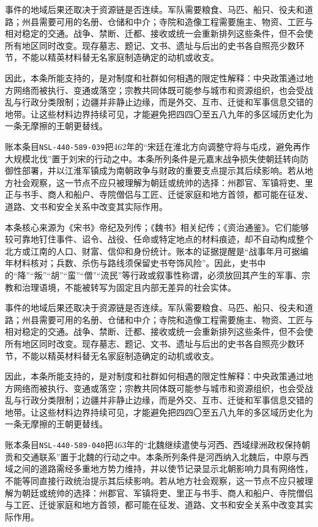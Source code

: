 事件的地域后果还取决于资源链是否连续。军队需要粮食、马匹、船只、役夫和道路；州县需要可用的名册、仓储和中介；寺院和造像工程需要施主、物资、工匠与相对稳定的交通。战争、禁断、迁都、接收或统一会重新排列这些条件，但不会使所有地区同时改变。现存墓志、题记、文书、遗址与后出的史书各自照亮少数环节，不能以精英材料替无名家庭制造确定的动机或收支。

因此，本条所能支持的，是对制度和社群如何相遇的限定性解释：中央政策通过地方网络而被执行、变通或落空；宗教共同体既可能参与城市和资源组织，也会受战乱与行政分类限制；边疆并非静止边缘，而是外交、互市、迁徙和军事信息交错的地带。让这些材料边界持续可见，才能避免把四四〇至五八九年的多区域历史化为一条无摩擦的王朝更替线。

账本条目\texttt{NSL-440-589-039}把462年的“宋廷在淮北方向调整守将与屯戍，避免再作大规模北伐”置于刘宋的行动之中。本条所列条件是元嘉末战争损失使朝廷转向防御性部署，并以江淮军镇成为南朝政争与财政的重要支点提示其后续影响。若从地方社会观察，这一节点不应只被理解为朝廷或统帅的选择：州郡官、军镇将吏、里正与书手、商人和船户、寺院僧侣与工匠、迁徙家庭和地方首领，都可能在征发、道路、文书和安全关系中改变其实际作用。

本条核心来源为《宋书》帝纪及列传；《魏书》相关纪传；《资治通鉴》。它们能够较可靠地钉住事件、诏令、战役、任命或特定地点的材料痕迹，却不自动构成整个北方或江南的人口、财富、信仰和身份统计。账本的证据提醒是“战事年月可据编年材料核对；兵数、杀伤与路线须保留史书夸饰风险”。因此，史书中的“降”“叛”“胡”“蛮”“僧”“流民”等行政或叙事性称谓，必须放回其产生的军事、宗教和治理语境，不能被转写为固定且内部无差异的社会实体。

事件的地域后果还取决于资源链是否连续。军队需要粮食、马匹、船只、役夫和道路；州县需要可用的名册、仓储和中介；寺院和造像工程需要施主、物资、工匠与相对稳定的交通。战争、禁断、迁都、接收或统一会重新排列这些条件，但不会使所有地区同时改变。现存墓志、题记、文书、遗址与后出的史书各自照亮少数环节，不能以精英材料替无名家庭制造确定的动机或收支。

因此，本条所能支持的，是对制度和社群如何相遇的限定性解释：中央政策通过地方网络而被执行、变通或落空；宗教共同体既可能参与城市和资源组织，也会受战乱与行政分类限制；边疆并非静止边缘，而是外交、互市、迁徙和军事信息交错的地带。让这些材料边界持续可见，才能避免把四四〇至五八九年的多区域历史化为一条无摩擦的王朝更替线。

账本条目\texttt{NSL-440-589-040}把463年的“北魏继续遣使与河西、西域绿洲政权保持朝贡和交通联系”置于北魏的行动之中。本条所列条件是河西纳入北魏后，中原与西域之间的道路需经多重地方势力维持，并以使节记录显示北朝影响力具有网络性，不能等同直接行政统治提示其后续影响。若从地方社会观察，这一节点不应只被理解为朝廷或统帅的选择：州郡官、军镇将吏、里正与书手、商人和船户、寺院僧侣与工匠、迁徙家庭和地方首领，都可能在征发、道路、文书和安全关系中改变其实际作用。

